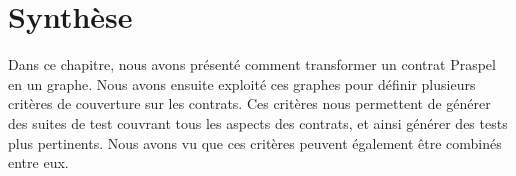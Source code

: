 \section{Synthèse}
\label{section:test:summary}

Dans ce chapitre, nous avons présenté comment transformer un contrat Praspel en
un graphe. Nous avons ensuite exploité ces graphes pour définir plusieurs
critères de couverture sur les contrats. Ces critères nous permettent de générer
des suites de test couvrant tous les aspects des contrats, et ainsi générer des
tests plus pertinents. Nous avons vu que ces critères peuvent également être
combinés entre eux.
